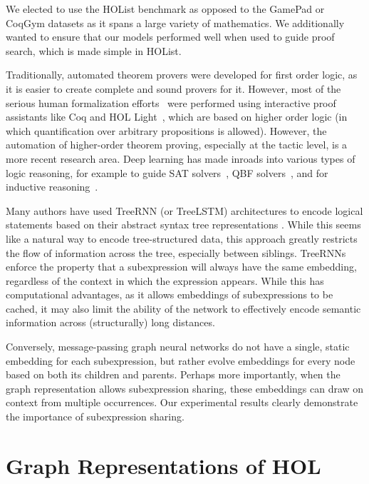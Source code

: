 \documentclass[letterpaper]{article} \usepackage{aaai20}  \usepackage{times}  \usepackage{helvet} \usepackage{courier}  \usepackage[hyphens]{url}  \usepackage{graphicx} \urlstyle{rm} \def\UrlFont{\rm}  \usepackage{graphicx}  \frenchspacing  \setlength{\pdfpagewidth}{8.5in}  \setlength{\pdfpageheight}{11in}
\newcommand{\citep}{\cite}
\begin{document}
We elected to use the HOList benchmark as opposed to the GamePad or CoqGym datasets as it spans a large variety of mathematics.
We additionally wanted to ensure that our models performed well when used to guide proof search, which is made simple in HOList.

Traditionally, automated theorem provers were developed for first order logic, as it is easier to create complete and sound provers for it. However, most of the serious human formalization efforts~\citep{gonthier2008formal,gonthier2013odd,hales2017formal} were performed using interactive proof assistants like Coq and HOL Light~\citep{Harrison96}, which are based on higher order logic (in which quantification over arbitrary propositions is allowed).
However, the automation of higher-order theorem proving, especially at the tactic level, is a more recent research area. Deep learning has made inroads into various types of logic reasoning, for example to guide SAT solvers~\citep{selsam2019guiding}, QBF solvers~\citep{Lederman2018QBF}, and for inductive reasoning~\citep{dong2018neural}.

Many authors have used TreeRNN (or TreeLSTM) architectures to encode logical statements based on their abstract syntax tree representations \citep{evans2018can,huang2018gamepad,loos2017deep}. While this seems like a natural way to encode tree-structured data, this approach greatly restricts the flow of information across the tree, especially between siblings. TreeRNNs enforce the property that a subexpression will always have the same embedding, regardless of the context in which the expression appears. While this has computational advantages, as it allows embeddings of subexpressions to be cached, it may also limit the ability of the network to effectively encode semantic information across (structurally) long distances.

Conversely, message-passing graph neural networks do not have a single, static embedding for each subexpression, but rather evolve embeddings for every node based on both its children and parents.  Perhaps more importantly, when the graph representation allows subexpression sharing, these embeddings can draw on context from multiple occurrences.  Our experimental results clearly demonstrate the importance of subexpression sharing. \section{Graph Representations of HOL}
\label{sec:graph-representations}
\end{document}
